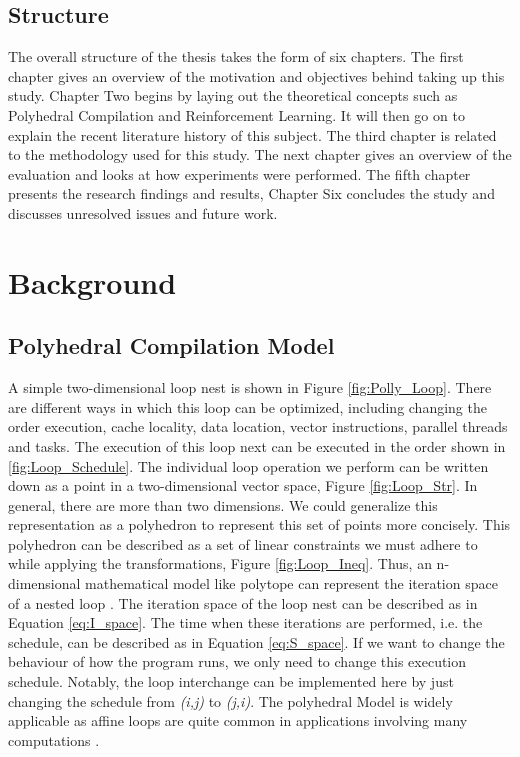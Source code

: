 \documentclass[logo,msc]{infthesis}           %
\begin{document}
\section{Structure}

The overall structure of the thesis takes the form of six chapters. The first chapter gives an overview of the motivation and objectives behind taking up this study. Chapter Two begins by laying out the theoretical concepts such as Polyhedral Compilation and Reinforcement Learning. It will then go on to explain the recent literature history of this subject. The third chapter is related to the methodology used for this study. The next chapter gives an overview of the evaluation and looks at how experiments were performed. The fifth chapter presents the research findings and results, Chapter Six concludes the study and discusses unresolved issues and future work.

\chapter{Background}

\section{Polyhedral Compilation Model}

 A simple two-dimensional loop nest is shown in Figure \ref{fig:Polly_Loop}. There are different ways in which this loop can be optimized, including changing the order execution, cache locality, data location, vector instructions, parallel threads and tasks. The execution of this loop next can be executed in the order shown in \ref{fig:Loop_Schedule}. The individual loop operation we perform can be written down as a point in a two-dimensional vector space, Figure \ref{fig:Loop_Str}. In general, there are more than two dimensions. We could generalize this representation as a polyhedron to represent this set of points more concisely. This polyhedron can be described as a set of linear constraints we must adhere to while applying the transformations, Figure \ref{fig:Loop_Ineq}. Thus, an n-dimensional mathematical model like polytope can represent the iteration space of a nested loop \cite{P3}. The iteration space of the loop nest can be described as in Equation \ref{eq:I_space}. The time when these iterations are performed, i.e. the schedule, can be described as in Equation \ref{eq:S_space}. If we want to change the behaviour of how the program runs, we only need to change this execution schedule. Notably, the loop interchange can be implemented here by just changing the schedule from \textit{(i,j)} to \textit{(j,i)}. The polyhedral Model is widely applicable as affine loops are quite common in applications involving many computations \cite{poly_applicable}.
\end{document}

